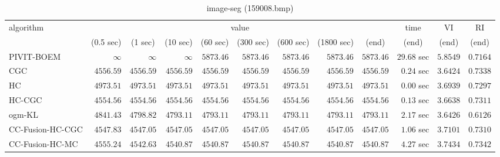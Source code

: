 \begin{table}[H]
\scriptsize
\centering
\caption{image-seg (159008.bmp)}
\label{tab:anytimetable-image-seg-159008.bmp}
\begin{tabular}{lrrrrrrrrrrr}
\toprule
           algorithm &                                   \multicolumn{8}{c}{value} & \multicolumn{1}{c}{time}    & \multicolumn{1}{c}{VI}  & \multicolumn{1}{c}{RI} \\  
\cmidrule(lr){2-9}\cmidrule(lr){10-10} \cmidrule(lr){11-11} \cmidrule(lr){12-12}   
                     & \multicolumn{1}{c}{(0.5 sec)} & \multicolumn{1}{c}{(1 sec)} & \multicolumn{1}{c}{(10 sec)} & \multicolumn{1}{c}{(60 sec)} & \multicolumn{1}{c}{(300 sec)} & \multicolumn{1}{c}{(600 sec)} & \multicolumn{1}{c}{(1800 sec)} & \multicolumn{1}{c}{(end)} & \multicolumn{1}{c}{(end)}    & \multicolumn{1}{c}{(end)}   & \multicolumn{1}{c}{(end)}  \\ \midrule 
          PIVIT-BOEM & $\infty$ & $\infty$ & $\infty$ & $      5873.46$ & $      5873.46$ & $      5873.46$ & $      5873.46$ & $      5873.46$ & $        29.68$ sec    & $       5.8549$  & $       0.7164$ \\ 
                 CGC & $      4556.59$ & $      4556.59$ & $      4556.59$ & $      4556.59$ & $      4556.59$ & $      4556.59$ & $      4556.59$ & $      4556.59$ & $         0.24$ sec    & $       3.6424$  & $       0.7338$ \\ 
                  HC & $      4973.51$ & $      4973.51$ & $      4973.51$ & $      4973.51$ & $      4973.51$ & $      4973.51$ & $      4973.51$ & $      4973.51$ & $         0.00$ sec    & $       3.6939$  & $       0.7297$ \\ 
              HC-CGC & $      4554.56$ & $      4554.56$ & $      4554.56$ & $      4554.56$ & $      4554.56$ & $      4554.56$ & $      4554.56$ & $      4554.56$ & $         0.13$ sec    & $       3.6638$  & $       0.7311$ \\ 
              ogm-KL & $      4841.43$ & $      4798.82$ & $      4793.11$ & $      4793.11$ & $      4793.11$ & $      4793.11$ & $      4793.11$ & $      4793.11$ & $         2.17$ sec    & $       3.6426$  & $       0.6126$ \\ 
    CC-Fusion-HC-CGC & $      4547.83$ & $      4547.05$ & $      4547.05$ & $      4547.05$ & $      4547.05$ & $      4547.05$ & $      4547.05$ & $      4547.05$ & $         1.06$ sec    & $       3.7101$  & $       0.7310$ \\ 
     CC-Fusion-HC-MC & $      4555.24$ & $      4542.63$ & $      4540.87$ & $      4540.87$ & $      4540.87$ & $      4540.87$ & $      4540.87$ & $      4540.87$ & $         4.27$ sec    & $       3.7434$  & $       0.7342$ \\ 

\end{tabular}
\end{table}
